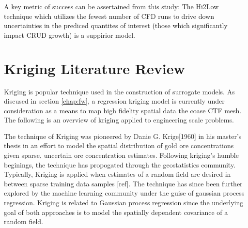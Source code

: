A key metric of success can be assertained from this study:  The Hi2Low technique which utilizes the fewest number of CFD runs to drive down uncertainties in the prediced quantites of interest (those which significantly impact CRUD growth) is a suppirior model.


\section{Kriging Literature Review}

Kriging is popular technique used in the construction of surrogate models.  As discused in section \ref{chap:fw}, a regression kriging model is currently under consideration as a means to map high fidelity spatial data the coase CTF mesh. The following is an overview of kriging applied to engineering scale problems.

The technique of Kriging was pioneered by Danie G. Krige[1960] in his master's thesis in an effort to model the spatial distribution of gold ore concentrations given sparse, uncertain ore concentration estimates. Following kriging's humble beginings, the technique has propogated through the geostatistics community. Typically, Kriging is applied when estimates of a random field are desired in between sparse training data samples [ref].  The technique has since been further explored by the machine learning community under the guise of gaussian process regression.
Kriging is related to Gaussian process regression since the underlying goal of both approaches is to model the spatially dependent covariance of a random field.  
